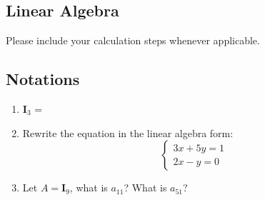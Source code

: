 \documentclass{assignment}
\begin{document}
\begin{problem}
\section{Linear Algebra}
\noindent Please include your calculation steps whenever applicable.

\subsection{Notations}
\begin{enumerate}
    \item $\mathbf{I}_3$ = 
    \item Rewrite the equation in the linear algebra form:
    \begin{equation}
        \begin{cases}
        3x + 5y = 1 \\
        2x - y = 0   
        \end{cases} 
    \end{equation}
    \item Let $A = \mathbf{I}_9$, what is $a_{11}$? What is $a_{51}$?
    
\end{enumerate}


\end{problem}
\end{document}
